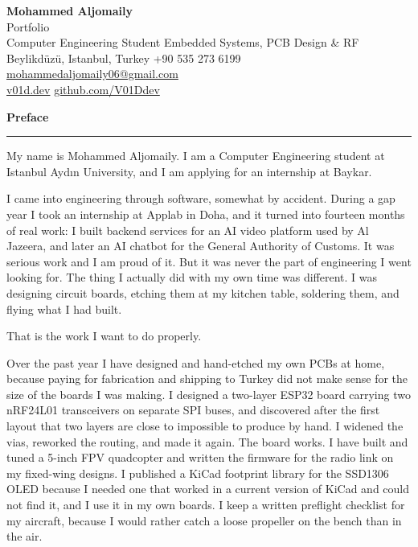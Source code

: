 \documentclass[11pt,a4paper]{article}
\newcommand{\entry}[2]{%
  \vspace{6pt}%
  {\Large\bfseries #1}\hfill{\itshape\small #2}\par
  \vspace{3pt}\hrule\vspace{4pt}%
}
\begin{document}
\begin{center}
    {\LARGE \textbf{Mohammed Aljomaily}}\\[3pt]
    {\large Portfolio}\\[6pt]
    {\small Computer Engineering Student \textbar{} Embedded Systems, PCB Design \& RF}\\[3pt]
    {\small Beylikd\"uz\"u, Istanbul, Turkey \textbar{} +90 535 273 6199 \textbar{}
    \href{mailto:mohammedaljomaily06@gmail.com}{mohammedaljomaily06@gmail.com}}\\[2pt]
    {\small \href{https://v01d.dev}{v01d.dev} \textbar{} \href{https://github.com/V01Ddev}{github.com/V01Ddev}}
\end{center}

\entry{Preface}{}

My name is Mohammed Aljomaily. I am a Computer Engineering student at Istanbul
Ayd{\i}n University, and I am applying for an internship at Baykar.

I came into engineering through software, somewhat by accident. During a gap
year I took an internship at Applab in Doha, and it turned into fourteen months
of real work: I built backend services for an AI video platform used by Al
Jazeera, and later an AI chatbot for the General Authority of Customs. It was
serious work and I am proud of it. But it was never the part of engineering I
went looking for. The thing I actually did with my own time was different. I was
designing circuit boards, etching them at my kitchen table, soldering them, and
flying what I had built.

That is the work I want to do properly.

Over the past year I have designed and hand-etched my own PCBs at home, because
paying for fabrication and shipping to Turkey did not make sense for the size of
the boards I was making. I designed a two-layer ESP32 board carrying two
nRF24L01 transceivers on separate SPI buses, and discovered after the first
layout that two layers are close to impossible to produce by hand. I widened the
vias, reworked the routing, and made it again. The board works. I have built and
tuned a 5-inch FPV quadcopter and written the firmware for the radio link on my
fixed-wing designs. I published a KiCad footprint library for the SSD1306 OLED
because I needed one that worked in a current version of KiCad and could not
find it, and I use it in my own boards. I keep a written preflight checklist for
my aircraft, because I would rather catch a loose propeller on the bench than in
the air.
\end{document}
